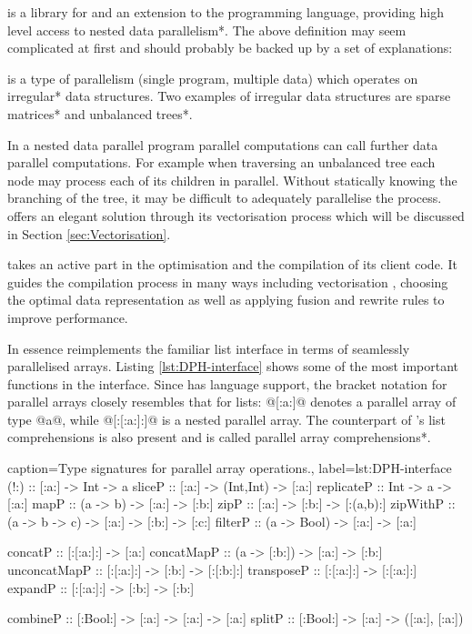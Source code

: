 \documentclass[preamble.tex]{subfiles}
\begin{document}
\idph{} is a library for and an extension to the \Haskell programming language, providing high level access to \*nested data parallelism*. The above definition may seem complicated at first and should probably be backed up by a set of explanations:

 is a type of  parallelism (single program, multiple data) which operates on \*irregular* data structures. Two examples of irregular data structures are \*sparse matrices* and \*unbalanced trees*.

In a nested data parallel program parallel computations can call further data parallel computations. For example when traversing an unbalanced tree each node may process each of its children in parallel. Without statically knowing the branching of the tree, it may be difficult to adequately parallelise the process. \DPH offers an elegant solution through its vectorisation process which will be discussed in Section \ref{sec:Vectorisation}.

\DPH takes an active part in the optimisation and the compilation of its client code. It guides the compilation process in many ways including vectorisation \cite{PLKC08}, choosing the optimal data representation \cite{CDL09} as well as applying fusion \cite{CLP+07} and rewrite rules \cite{PTH01} to improve performance.

In essence \DPH reimplements the familiar list interface in terms of seamlessly parallelised arrays. Listing \ref{lst:DPH-interface} shows some of the most important functions in the \DPH interface. Since \DPH has language support, the bracket notation for parallel arrays closely resembles that for \Haskell lists: @[:a:]@ denotes a parallel array of type @a@, while @[:[:a:]:]@ is a nested parallel array. The counterpart of \Haskell's list comprehensions is also present and is called \*parallel array comprehensions*.


\begin{hscode2}{%
	caption={Type signatures for parallel array operations.},%
	label=lst:DPH-interface}
(!:)         :: [:a:] -> Int -> a
sliceP       :: [:a:] -> (Int,Int) -> [:a:]
replicateP   :: Int -> a -> [:a:]
mapP         :: (a -> b) -> [:a:] -> [:b:]
zipP         :: [:a:] -> [:b:] -> [:(a,b):]
zipWithP     :: (a -> b -> c) -> [:a:] -> [:b:] -> [:c:]
filterP      :: (a -> Bool) -> [:a:] -> [:a:]

concatP      :: [:[:a:]:] -> [:a:]
concatMapP   :: (a -> [:b:]) -> [:a:] -> [:b:]
unconcatMapP :: [:[:a:]:] -> [:b:] -> [:[:b:]:]
transposeP   :: [:[:a:]:] -> [:[:a:]:]
expandP      :: [:[:a:]:] -> [:b:] -> [:b:]

combineP     :: [:Bool:] -> [:a:] -> [:a:] -> [:a:]
splitP       :: [:Bool:] -> [:a:] -> ([:a:], [:a:])
\end{hscode2}
\end{document}
